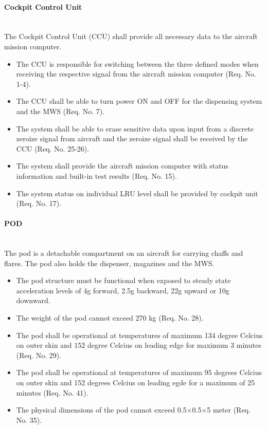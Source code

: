 \paragraph{Cockpit Control Unit}\mbox{}\\
The Cockpit Control Unit (CCU) shall provide all necessary data to the aircraft mission computer.
\begin{itemize}
\item The CCU is responsible for switching between the three defined modes when receiving the respective signal from the aircraft mission computer (Req. No. 1-4).
\item The CCU shall be able to turn power ON and OFF for the dispensing system and the MWS (Req. No. 7).
\item The system shall be able to erase sensitive data upon input from a discrete zeroize signal from aircraft and the zeroize signal shall be received by the CCU (Req. No. 25-26).
\item The system shall provide the aircraft mission computer with status information and built-in test results (Req. No. 15).
\item The system status on individual LRU level shall be provided by cockpit unit (Req. No. 17).
\end{itemize}

\paragraph{POD}\mbox{}\\
The pod is a detachable compartment on an aircraft for carrying chaffs and flares. The pod also holds the dispenser, magazines and the MWS.
\begin{itemize}
\item The pod structure must be functional when exposed to steady state acceleration levels of 4g forward, 2.5g backward, 22g upward or 10g downward.
\item The weight of the pod cannot exceed 270 kg (Req. No. 28).
\item The pod shall be operational at temperatures of maximum 134 degree Celcius on outer skin and 152 degree Celcius on leading edge for maximum 3 minutes (Req. No. 29).
\item The pod shall be operational at temperatures of maximum 95 degrees Celcius on outer skin and 152 degrees Celcius on leading egde for a maximum of 25 minutes (Req. No. 41).
\item The physical dimensions of the pod cannot exceed 0.5$\times$0.5$\times$5 meter (Req. No. 35).
\end{itemize}

